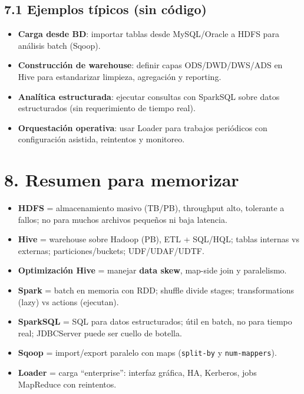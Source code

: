 \documentclass[8pt,a4paper,twocolumn]{article}
\begin{document}
\subsection{7.1 Ejemplos típicos (sin código)}
\begin{itemize}
\item \textbf{Carga desde BD}: importar tablas desde MySQL/Oracle a HDFS para análisis batch (Sqoop).
\item \textbf{Construcción de warehouse}: definir capas ODS/DWD/DWS/ADS en Hive para estandarizar limpieza, agregación y reporting.
\item \textbf{Analítica estructurada}: ejecutar consultas con SparkSQL sobre datos estructurados (sin requerimiento de tiempo real).
\item \textbf{Orquestación operativa}: usar Loader para trabajos periódicos con configuración asistida, reintentos y monitoreo.
\end{itemize}

\section{8. Resumen para memorizar}
\begin{itemize}
\item \textbf{HDFS} = almacenamiento masivo (TB/PB), throughput alto, tolerante a fallos; no para muchos archivos pequeños ni baja latencia.
\item \textbf{Hive} = warehouse sobre Hadoop (PB), ETL + SQL/HQL; tablas internas vs externas; particiones/buckets; UDF/UDAF/UDTF.
\item \textbf{Optimización Hive} = manejar \textbf{data skew}, map-side join y paralelismo.
\item \textbf{Spark} = batch en memoria con RDD; shuffle divide stages; transformations (lazy) vs actions (ejecutan).
\item \textbf{SparkSQL} = SQL para datos estructurados; útil en batch, no para tiempo real; JDBCServer puede ser cuello de botella.
\item \textbf{Sqoop} = import/export paralelo con maps (\texttt{split-by} y \texttt{num-mappers}).
\item \textbf{Loader} = carga ``enterprise'': interfaz gráfica, HA, Kerberos, jobs MapReduce con reintentos.
\end{itemize}
\end{document}
